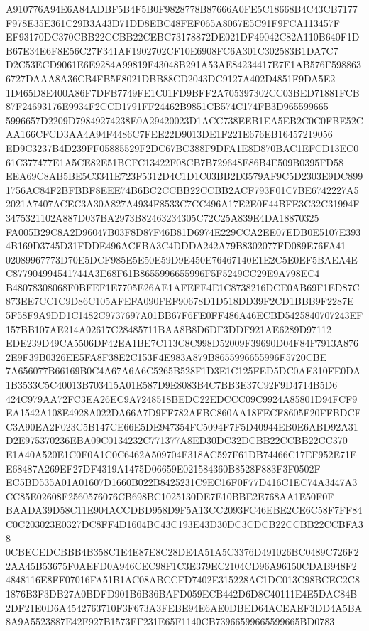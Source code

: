 \documentclass[UTF8,fontset=fandol,zihao=-4,a4paper]{ctexart}
\begin{document}
{{A910776A94E6A84ADBF5B4F5B0F9828778B87666A0FE5C18668B4C43CB7177F978E35E361C29B3A43D71DD8EBC48FEF065A8067E5C91F9FCA113457F
EF93170DC370CBB22CCBB22CEBC73178872DE021DF49042C82A110B640F1DB67E34E6F8E56C27F341AF1902702CF10E6908FC6A301C302583B1DA7C7
D2C53ECD9061E6E9284A99819F43048B291A53AE84234417E7E1AB576F5988636727DAAA8A36CB4FB5F8021DBB88CD2043DC9127A402D4851F9DA5E2
1D465D8E400A86F7DFB7749FE1C01FD9BFF2A705397302CC03BED71881FCB87F24693176E9934F2CCD1791FF24462B9851CB574C174FB3D965599665
5996657D2209D79849274238E0A29420023D1ACC738EEB1EA5EB2C0C0FBE52CAA166CFCD3AA4A94F4486C7FEE22D9013DE1F221E676EB16457219056
ED9C3237B4D239FF05885529F2DC67BC388F9DFA1E8D870BAC1EFCD13EC061C377477E1A5CE82E51BCFC13422F08CB7B729648E86B4E509B0395FD58
EEA69C8AB5BE5C3341E723F5312D4C1D1C03BB2D3579AF9C5D2303E9DC8991756AC84F2BFBBF8EEE74B6BC2CCBB22CCBB2ACF793F01C7BE6742227A5
2021A7407ACEC3A30A827A4934F8533C7CC496A17E2E0E44BFE3C32C31994F3475321102A887D037BA2973B82463234305C72C25A839E4DA18870325
FA005B29C8A2D96047B03F8D87F46B81D6974E229CCA2EE07EDB0E5107E3934B169D3745D31FDDE496ACFBA3C4DDDA242A79B8302077FD089E76FA41
02089967773D70E5DCF985E5E50E59D9E450E76467140E1E2C5E0EF5BAEA4EC877904994541744A3E68F61B8655996655996F5F5249CC29E9A798EC4
B48078308068F0BFEF1E7705E26AE1AFEFE4E1C8738216DCE0AB69F1ED87C873EE7CC1C9D86C105AFEFA090FEF90678D1D518DD39F2CD1BBB9F2287E
5F58F9A9DD1C1482C9737697A01BB67F6FE0FF486A46ECBD5425840707243EF157BB107AE214A02617C28485711BAA8B8D6DF3DDF921AE6289D97112
EDE239D49CA5506DF42EA1BE7C113C8C998D52009F39690D04F84F7913A8762E9F39B0326EE5FA8F38E2C153F4E983A879B8655996655996F5720CBE
7A656077B66169B0C4A67A6A6C5265B528F1D3E1C125FED5DC0AE310FE0DA1B3533C5C40013B703415A01E587D9E8083B4C7BB3E37C92F9D4714B5D6
424C979AA72FC3EA26EC9A7248518BEDC22EDCCC09C9924A85801D94FCF9EA1542A108E4928A022DA66A7D9FF782AFBC860AA18FECF8605F20FFBDCF
C3A90EA2F023C5B147CE66E5DE947354FC5094F7F5D40944EB0E6ABD92A31D2E975370236EBA09C0134232C771377A8ED30DC32DCBB22CCBB22CC370
E1A40A520E1C0F0A1C0C6462A509704F318AC597F61DB74466C17EF952E71EE68487A269EF27DF4319A1475D06659E021584360B8528F883F3F0502F
EC5BD535A01A01607D1660B022B8425231C9EC16F0F77D416C1EC74A3447A3CC85E02608F2560576076CB698BC1025130DE7E10BBE2E768AA1E50F0F
BAADA39D58C11E904ACCDBD958D9F5A13CC2093FC46EBE2CE6C58F7FF84C0C203023E0327DC8FF4D1604BC43C193E43D30DC3CDCB22CCBB22CCBFA38
0CBECEDCBBB4B358C1E4E87E8C28DE4A51A5C3376D491026BC0489C726F22AA45B53675F0AEFD0A946CEC98F1C3E379EC2104CD96A96150CDAB948F2
4848116E8FF07016FA51B1AC08ABCCFD7402E315228AC1DC013C98BCEC2C81876B3F3DB27A0BDFD901B6B36BAFD059ECB442D6D8C40111E4E5DAC84B
2DF21E0D6A4542763710F3F673A3FEBE94E6AE0DBED64ACEAEF3DD4A5BA8A9A5523887E42F927B1573FF231E65F1140CB73966599665599665BD0783
}}
\end{document}

